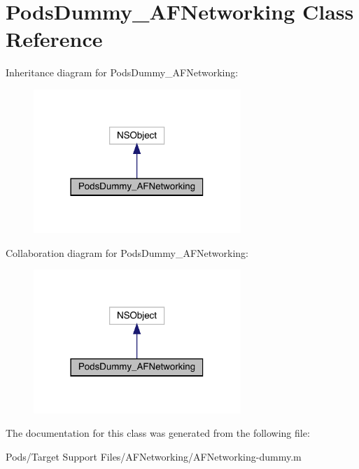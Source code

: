 \hypertarget{interface_pods_dummy___a_f_networking}{}\section{Pods\+Dummy\+\_\+\+A\+F\+Networking Class Reference}
\label{interface_pods_dummy___a_f_networking}


Inheritance diagram for Pods\+Dummy\+\_\+\+A\+F\+Networking\+:\nopagebreak
\begin{figure}[H]
\begin{center}
\leavevmode
\includegraphics[width=222pt]{interface_pods_dummy___a_f_networking__inherit__graph}
\end{center}
\end{figure}


Collaboration diagram for Pods\+Dummy\+\_\+\+A\+F\+Networking\+:\nopagebreak
\begin{figure}[H]
\begin{center}
\leavevmode
\includegraphics[width=222pt]{interface_pods_dummy___a_f_networking__coll__graph}
\end{center}
\end{figure}


The documentation for this class was generated from the following file\+:\begin{DoxyCompactItemize}
\item 
Pods/\+Target Support Files/\+A\+F\+Networking/A\+F\+Networking-\/dummy.\+m\end{DoxyCompactItemize}
